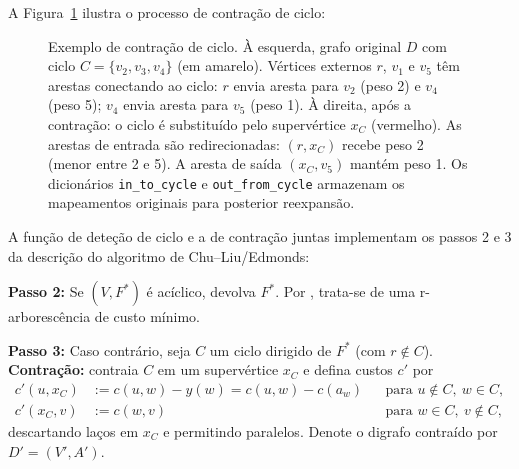 A Figura~\ref{fig:contract-cycle-example} ilustra o processo de contração de ciclo:

\begin{figure}[H]
    \centering
    
    \caption{Exemplo de contração de ciclo. À esquerda, grafo original \(D\) com ciclo \(C=\{v_2, v_3, v_4\}\) (em amarelo). Vértices externos \(r\), \(v_1\) e \(v_5\) têm arestas conectando ao ciclo: \(r\) envia aresta para \(v_2\) (peso 2) e \(v_4\) (peso 5); \(v_4\) envia aresta para \(v_5\) (peso 1). À direita, após a contração: o ciclo é substituído pelo supervértice \(x_C\) (vermelho). As arestas de entrada são redirecionadas: \((r, x_C)\) recebe peso 2 (menor entre 2 e 5). A aresta de saída \((x_C, v_5)\) mantém peso 1. Os dicionários \texttt{in\_to\_cycle} e \texttt{out\_from\_cycle} armazenam os mapeamentos originais para posterior reexpansão.}
    \label{fig:contract-cycle-example}
\end{figure}

A função de deteção de ciclo e a de contração juntas implementam os passos 2 e 3 da descrição do algoritmo de Chu–Liu/Edmonds:

\begin{tcolorbox}[
        enhanced, breakable,
        colframe=green!60!black, colback=green!5,
        colbacktitle=green!20, coltitle=black,
        title={Passos 2 e 3 do Algoritmo de Chu–Liu/Edmonds},
        boxed title style={sharp corners, boxrule=0.6pt},
        sharp corners, boxrule=0.6pt
    ]
    \textbf{Passo 2:} Se \((V,F^*)\) é acíclico, devolva \(F^*\). Por \cite[Obs.~4.36]{kleinberg2006}, trata-se de uma r-arborescência de custo mínimo.

    \textbf{Passo 3:} Caso contrário, seja \(C\) um ciclo dirigido de \(F^*\) (com \(r\notin C\)). \textbf{Contração:} contraia \(C\) em um supervértice \(x_C\) e defina custos \(c'\) por
    \begin{align*}
        c'(u,x_C) & := c(u,w) - y(w) = c(u,w) - c(a_w) &  & \text{para } u\notin C,\ w\in C, \\
        c'(x_C,v) & := c(w,v)                          &  & \text{para } w\in C,\ v\notin C,
    \end{align*}
    descartando laços em \(x_C\) e permitindo paralelos. Denote o digrafo contraído por \(D'=(V',A')\).
\end{tcolorbox}

